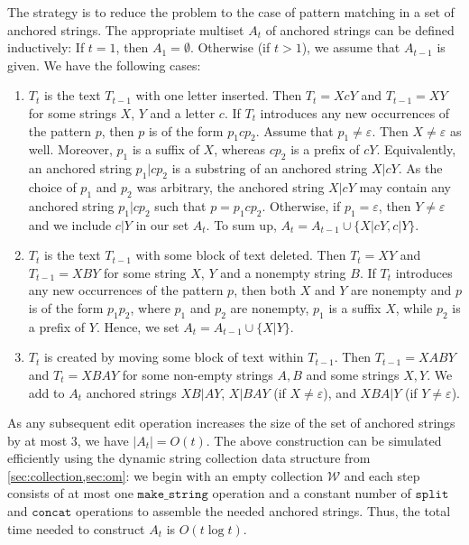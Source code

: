 \documentclass[a4paper]{article}
\theoremstyle{remark}
\newcommand{\makeop}{\mathtt{make\_string}}
\newcommand{\concop}{\mathtt{concat}}
\newcommand{\splitop}{\mathtt{split}}
\newcommand{\coll}{\mathcal{W}}
\newcommand{\eps}{\varepsilon}
\begin{document}
The strategy is to reduce the problem to the case of pattern matching in
a set of anchored strings.
The appropriate multiset $A_t$ of anchored strings can be defined inductively:
If $t=1$, then $A_1=\emptyset$.
Otherwise (if $t>1$), we assume that $A_{t-1}$ is given. We have the following cases:
  \begin{enumerate}
    \item $T_t$ is the text $T_{t-1}$ with one letter inserted. Then
      $T_t=XcY$ and $T_{t-1}=XY$ for some strings $X$, $Y$ and a letter $c$.
      If $T_t$ introduces any new occurrences of the pattern $p$, then $p$ is
      of the form $p_1cp_2$.
      Assume that $p_1\neq\eps$.
      Then $X\neq\eps$ as well.
      Moreover, $p_1$ is a suffix of $X$, whereas $cp_2$ is a prefix of $cY$.
      Equivalently, an anchored string $p_1|cp_2$ is a substring of an
      anchored string $X|cY$.
      As the choice of $p_1$ and $p_2$ was arbitrary, the anchored string $X|cY$
      may contain any anchored string $p_1|cp_2$ such that $p=p_1cp_2$.
      Otherwise, if $p_1=\eps$, then $Y\neq\eps$ and we include $c|Y$ in our set $A_t$.
      To sum up, $A_t=A_{t-1}\cup\{X|cY,c|Y\}$.

    \item $T_t$ is the text $T_{t-1}$ with some block of text deleted.
      Then $T_t=XY$ and $T_{t-1}=XBY$ for some string $X$, $Y$ and a nonempty string
      $B$.
      If $T_t$ introduces any new occurrences of the pattern $p$, then both $X$ and $Y$
      are nonempty and $p$ is of the form $p_1p_2$, where $p_1$ and $p_2$ are nonempty,
      $p_1$ is a suffix $X$, while $p_2$ is a prefix of $Y$.
      Hence, we set $A_t=A_{t-1}\cup\{X|Y\}$.

    \item $T_t$ is created by moving some block of text within $T_{t-1}$.
    	Then $T_{t-1}=XABY$ and $T_t = XBAY$ for some non-empty strings $A,B$
      and some strings $X,Y$.
      We add to $A_t$ anchored strings $XB|AY$, $X|BAY$ (if $X\ne \eps$), and $XBA|Y$ (if $Y\ne \eps$).
  \end{enumerate}

As any subsequent edit operation increases the size of the set of anchored
strings by at most $3$, we have $|A_t|=O(t)$.
The above construction can be simulated efficiently using the dynamic string
collection data structure from \cref{sec:collection,sec:om}:
we begin with an empty collection $\coll$ and
each step consists of at most one $\makeop$ operation and a constant
number of $\splitop$ and $\concop$ operations to assemble the needed
anchored strings.
Thus, the total time needed to construct $A_t$ is $O(t\log t)$.
\end{document}
